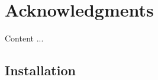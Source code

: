 \documentclass[article]{jss}
\begin{document}
\section*{Acknowledgments}
Content ...






\newpage

\begin{appendix}

\section{Installation} \label{app:installation}

\end{appendix}

\end{document}

